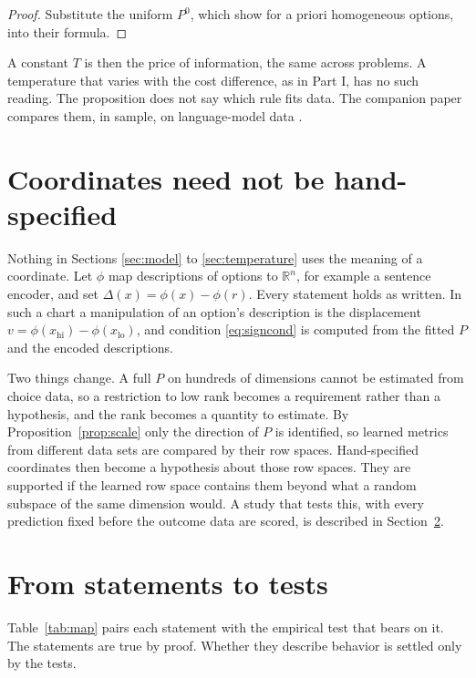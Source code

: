 \documentclass[11pt]{article}
\theoremstyle{definition}
\newcommand{\R}{\mathbb{R}}
\begin{document}
\begin{proof}
Substitute the uniform $P^0$, which \citet{MatejkaMcKay2015} show for a priori homogeneous options, into their formula.
\end{proof}

A constant $T$ is then the price of information, the same across problems.
A temperature that varies with the cost difference, as in Part I, has no such reading.
The proposition does not say which rule fits data.
The companion paper compares them, in sample, on language-model data \citep{BondPartII}.

\section{Coordinates need not be hand-specified}\label{sec:learned}

Nothing in Sections \ref{sec:model} to \ref{sec:temperature} uses the meaning of a coordinate.
Let $\phi$ map descriptions of options to $\R^n$, for example a sentence encoder, and set $\Delta(x) = \phi(x) - \phi(r)$.
Every statement holds as written.
In such a chart a manipulation of an option's description is the displacement $v = \phi(x_{\mathrm{hi}}) - \phi(x_{\mathrm{lo}})$, and condition \eqref{eq:signcond} is computed from the fitted $P$ and the encoded descriptions.

Two things change.
A full $P$ on hundreds of dimensions cannot be estimated from choice data, so a restriction to low rank becomes a requirement rather than a hypothesis, and the rank becomes a quantity to estimate.
By Proposition~\ref{prop:scale} only the direction of $P$ is identified, so learned metrics from different data sets are compared by their row spaces.
Hand-specified coordinates then become a hypothesis about those row spaces.
They are supported if the learned row space contains them beyond what a random subspace of the same dimension would.
A study that tests this, with every prediction fixed before the outcome data are scored, is described in Section~\ref{sec:map}.

\section{From statements to tests}\label{sec:map}

Table~\ref{tab:map} pairs each statement with the empirical test that bears on it.
The statements are true by proof.
Whether they describe behavior is settled only by the tests.
\end{document}
